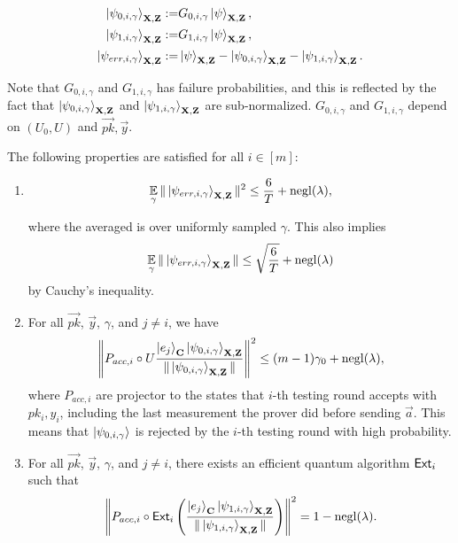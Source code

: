 \begin{lemma}
	\begin{align}
	\label{eq:psi0}
	\ket{\psi_{0,i,\gamma}}_{\mathbf{X},\mathbf{Z}}
	:=&
	G_{0,i,\gamma}\ket{\psi}_{\mathbf{X},\mathbf{Z}}, \\ 
	\label{eq:psi1}	
	\ket{\psi_{1,i,\gamma}}_{\mathbf{X},\mathbf{Z}}
	 :=&
	G_{1,i,\gamma}\ket{\psi}_{\mathbf{X},\mathbf{Z}}
	,  \\
	\label{eq:psierr}
	\ket{\psi_{err,i,\gamma}}_{\mathbf{X},\mathbf{Z}}
	:=&
	\ket{\psi}_{\mathbf{X},\mathbf{Z}} -\ket{\psi_{0,i,\gamma}}_{\mathbf{X},\mathbf{Z}}- \ket{\psi_{1,i,\gamma}}_{\mathbf{X},\mathbf{Z}}
	.
	\end{align}

	Note that $G_{0,i,\gamma}$ and $G_{1,i,\gamma}$ has failure probabilities, and this is reflected by the fact that $\ket{\psi_{0,i,\gamma}}_{\mathbf{X},\mathbf{Z}}$ and $\ket{\psi_{1,i,\gamma}}_{\mathbf{X},\mathbf{Z}}$ are  sub-normalized. $G_{0,i,\gamma}$ and $G_{1,i,\gamma}$ depend on $(U_0,U)$ and $\vec{pk},\vec{y}$.

	The following properties are satisfied for all $i\in[m]$:
	\begin{enumerate}
		\item \label{property:partition-err}  $$\operatorname*{\mathbb{E}}_{\gamma}\|\ket{\psi_{err,i,\gamma}}_{\mathbf{X},\mathbf{Z}}\|^2 \leq \frac{6}{T}+\operatorname{negl}(\lambda),$$

			where the averaged is over uniformly sampled $\gamma$. This also implies
			\begin{align}
				\operatorname*{\mathbb{E}}_{\gamma}\|\ket{\psi_{err,i,\gamma}}_{\mathbf{X},\mathbf{Z}}\| \leq \sqrt{\frac{6}{T}}+\operatorname{negl}(\lambda)
			\end{align}
			by Cauchy's inequality.

		\item \label{property:partition-testing}
			For all $\vec{pk}$, $\vec{y}$, $\gamma$, and  $j\neq i$, we have
			\begin{align}
				\left\lVert P_{acc, i} \circ U\frac{\ket{e_j}_{\mathbf{C}}\ket{\psi_{0,i,\gamma}}_{\mathbf{X},\mathbf{Z}}}{\|\ket{\psi_{0,i,\gamma}}_{\mathbf{X},\mathbf{Z}}\|}\right\rVert^2 \leq (m-1)\gamma_0+\operatorname{negl}(\lambda),
			\end{align}
			where $P_{acc, i}$ are projector to the states that $i$-th testing round accepts with $pk_i,y_i$, including the last measurement the prover did before sending $\vec{a}$.  This means that $\ket{\psi_{0,i,\gamma}}$ is rejected by the $i$-th testing round with high probability.
		\item \label{property:partition-binding}
			For all $\vec{pk}$, $\vec{y}$, $\gamma$, and $j\neq i$, there exists an efficient quantum algorithm $\mathsf{Ext}_i$ such that
			\begin{align}
				\left\lVert P_{acc, i} \circ \mathsf{Ext}_i\left(\frac{\ket{e_j}_{\mathbf{C}}\ket{\psi_{1,i,\gamma}}_{\mathbf{X},\mathbf{Z}}}{\|\ket{\psi_{1,i,\gamma}}_{\mathbf{X},\mathbf{Z}}\|}\right)\right\rVert^2 =1-\operatorname{negl}(\lambda).
			\end{align}


\end{enumerate}
\end{lemma}

